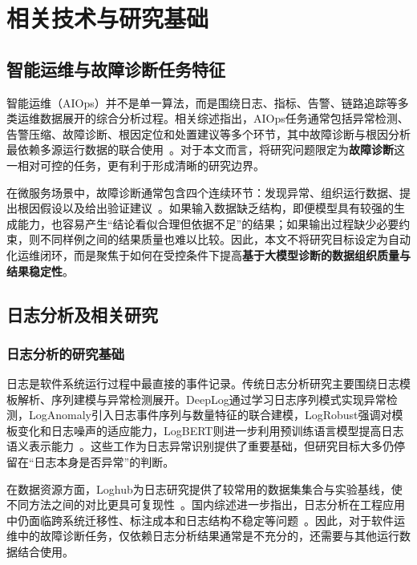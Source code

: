 \chapter{相关技术与研究基础}

\section{智能运维与故障诊断任务特征}

智能运维（AIOps）并不是单一算法，而是围绕日志、指标、告警、链路追踪等多类运维数据展开的综合分析过程。相关综述指出，AIOps任务通常包括异常检测、告警压缩、故障诊断、根因定位和处置建议等多个环节，其中故障诊断与根因分析最依赖多源运行数据的联合使用~\cite{soldani2023survey,zhang2026aiopssurvey,zhang2024fdsurvey}。对于本文而言，将研究问题限定为\textbf{故障诊断}这一相对可控的任务，更有利于形成清晰的研究边界。

在微服务场景中，故障诊断通常包含四个连续环节：发现异常、组织运行数据、提出根因假设以及给出验证建议~\cite{cheng2023rcasurvey,pham2024rcacausal}。如果输入数据缺乏结构，即便模型具有较强的生成能力，也容易产生“结论看似合理但依据不足”的结果；如果输出过程缺少必要约束，则不同样例之间的结果质量也难以比较。因此，本文不将研究目标设定为自动化运维闭环，而是聚焦于如何在受控条件下提高\textbf{基于大模型诊断的数据组织质量与结果稳定性}。

\section{日志分析及相关研究}

\subsection{日志分析的研究基础}

日志是软件系统运行过程中最直接的事件记录。传统日志分析研究主要围绕日志模板解析、序列建模与异常检测展开。DeepLog通过学习日志序列模式实现异常检测，LogAnomaly引入日志事件序列与数量特征的联合建模，LogRobust强调对模板变化和日志噪声的适应能力，LogBERT则进一步利用预训练语言模型提高日志语义表示能力~\cite{du2017deeplog,meng2019loganomaly,zhang2019logrobust,guo2021logbert}。这些工作为日志异常识别提供了重要基础，但研究目标大多仍停留在“日志本身是否异常”的判断。

在数据资源方面，Loghub为日志研究提供了较常用的数据集集合与实验基线，使不同方法之间的对比更具可复现性~\cite{he2020loghub,zhu2023loghub}。国内综述进一步指出，日志分析在工程应用中仍面临跨系统迁移性、标注成本和日志结构不稳定等问题~\cite{jia2020logsurvey,yan2022logsurveyml}。因此，对于软件运维中的故障诊断任务，仅依赖日志分析结果通常是不充分的，还需要与其他运行数据结合使用。

